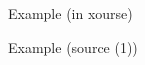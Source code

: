 \begin{frame}{Example (in xourse)}
  
  \begin{center}
  
  \end{center}
  
\end{frame}

\begin{frame}{Example (source (1))}
  
  \begin{center}
  
  \end{center}
  
\end{frame}

